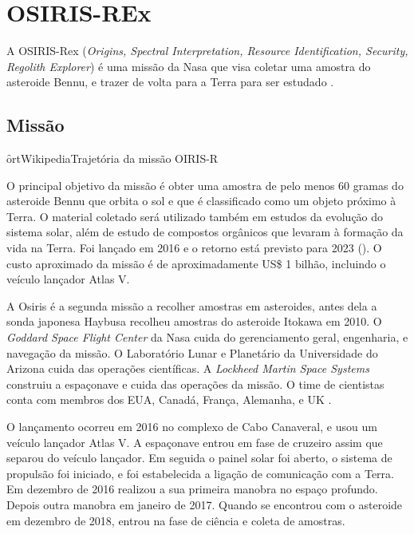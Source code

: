 
\chapter{OSIRIS-REx}
\label{chp:orex}

A OSIRIS-Rex (\textit{Origins, Spectral Interpretation, Resource Identification, Security, Regolith Explorer}) é uma missão da Nasa que visa coletar uma amostra do asteroide Bennu, e trazer de volta para a Terra para ser estudado \cite{NMOR}.

\section{Missão} %

\f{ort}{Wikipedia}{Trajetória da missão OIRIS-R}

O principal objetivo da missão é obter uma amostra de pelo menos 60 gramas do asteroide Bennu que orbita o sol e que é classificado como um objeto próximo à Terra. O material coletado será utilizado também em estudos da evolução do sistema solar, além de estudo de compostos orgânicos que levaram à formação da vida na Terra. Foi lançado em 2016 e o retorno está previsto para 2023 (). O custo aproximado da missão é de aproximadamente US\$ 1 bilhão, incluindo o veículo lançador Atlas V.

A Osiris é a segunda missão a recolher amostras em asteroides, antes dela a sonda japonesa Haybusa recolheu amostras do asteroide Itokawa em 2010.
O \textit{Goddard Space Flight Center} da Nasa cuida do gerenciamento geral, engenharia, e navegação da missão. O Laboratório Lunar e Planetário da Universidade do Arizona cuida das operações científicas.
A \textit{Lockheed Martin Space Systems} construiu a espaçonave e cuida das operações da missão.
O time de cientistas conta com membros dos EUA, Canadá, França, Alemanha, e UK \cite{OSIRIS-REx}.

O lançamento ocorreu em 2016 no complexo de Cabo Canaveral, e usou um veículo lançador Atlas V. A espaçonave entrou em fase de cruzeiro assim que  separou do veículo lançador. Em seguida o painel solar foi aberto, o sistema de propulsão foi iniciado, e foi estabelecida a ligação de comunicação com a Terra. Em dezembro de 2016 realizou a sua primeira manobra no espaço profundo. Depois outra manobra em janeiro de 2017. Quando se encontrou com o asteroide em dezembro de 2018, entrou na fase de ciência e coleta de amostras.

